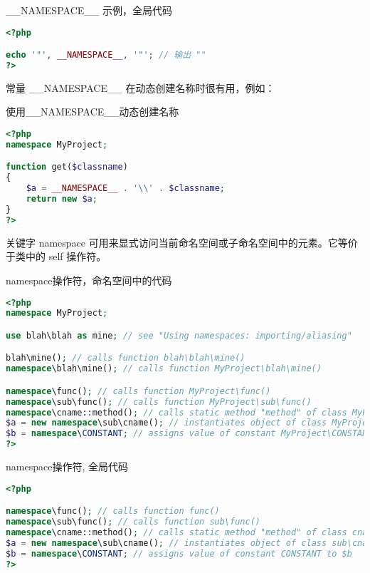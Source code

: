 \begin{example}
\_\_NAMESPACE\_\_ 示例，全局代码
\begin{lstlisting}[language=PHP]
<?php

echo '"', __NAMESPACE__, '"'; // 输出 ""
?>
\end{lstlisting}
\end{example}

常量 \_\_NAMESPACE\_\_ 在动态创建名称时很有用，例如：



\begin{example}
使用\_\_NAMESPACE\_\_动态创建名称
\begin{lstlisting}[language=PHP]
<?php
namespace MyProject;

function get($classname)
{
    $a = __NAMESPACE__ . '\\' . $classname;
    return new $a;
}
?>
\end{lstlisting}
\end{example}


关键字 namespace 可用来显式访问当前命名空间或子命名空间中的元素。它等价于类中的 self 操作符。


\begin{example}
namespace操作符，命名空间中的代码
\begin{lstlisting}[language=PHP]
<?php
namespace MyProject;

use blah\blah as mine; // see "Using namespaces: importing/aliasing"

blah\mine(); // calls function blah\blah\mine()
namespace\blah\mine(); // calls function MyProject\blah\mine()

namespace\func(); // calls function MyProject\func()
namespace\sub\func(); // calls function MyProject\sub\func()
namespace\cname::method(); // calls static method "method" of class MyProject\cname
$a = new namespace\sub\cname(); // instantiates object of class MyProject\sub\cname
$b = namespace\CONSTANT; // assigns value of constant MyProject\CONSTANT to $b
?>
\end{lstlisting}
\end{example}



\begin{example}
namespace操作符, 全局代码
\begin{lstlisting}[language=PHP]
<?php

namespace\func(); // calls function func()
namespace\sub\func(); // calls function sub\func()
namespace\cname::method(); // calls static method "method" of class cname
$a = new namespace\sub\cname(); // instantiates object of class sub\cname
$b = namespace\CONSTANT; // assigns value of constant CONSTANT to $b
?>
\end{lstlisting}
\end{example}

